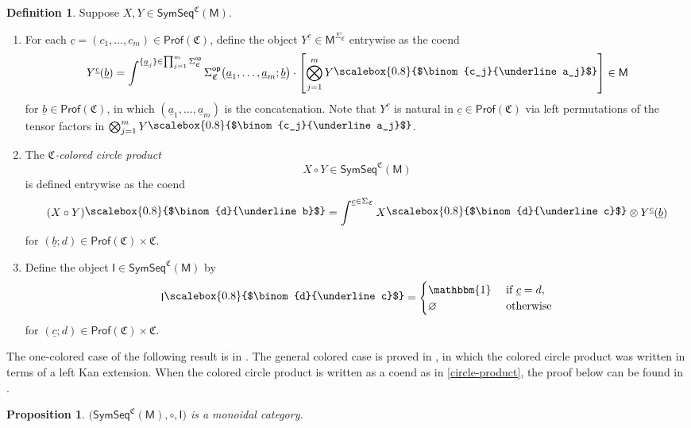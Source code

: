 \documentclass[11pt]{amsbook}
\numberwithin{section}{chapter}
\numberwithin{subsection}{section}
\numberwithin{equation}{section}
\theoremstyle{plain}
\newtheorem{proposition}[equation]{Proposition}
\theoremstyle{definition}
\newtheorem{definition}[equation]{Definition}
\newcommand{\colorc}{\mathfrak{C}}
\newcommand{\Prof}{\mathsf{Prof}}
\newcommand{\Profc}{\Prof(\colorc)}
\newcommand{\Profcc}{\Profc \times \colorc}
\newcommand{\op}{\mathsf{op}}
\newcommand{\I}{\mathsf{I}}
\newcommand{\M}{\mathsf{M}}
\newcommand{\tensorunit}{\mathbbm{1}}
\renewcommand{\emptyset}{\varnothing}
\newcommand{\Sigmaop}{\Sigma^{\op}}
\newcommand{\Sigmac}{\Sigma_{\colorc}}
\newcommand{\Sigmacop}{\Sigmaop_{\colorc}}
\newcommand{\symseq}{\mathsf{SymSeq}}
\newcommand{\symseqcm}{\symseq^{\colorc}(\M)}
\newcommand{\ua}{\underline a}
\newcommand{\ub}{\underline b}
\newcommand{\uc}{\underline c}
\newcommand{\smallprof}[1]
{\raisebox{.05cm}{\scalebox{0.8}{#1}}}
\newcommand{\cjuaj}{\smallprof{$\binom{c_j}{\ua_j}$}}
\newcommand{\dub}{\smallprof{$\binom{d}{\ub}$}}
\newcommand{\duc}{\smallprof{$\binom{d}{\uc}$}}
\begin{document}
\begin{definition}\label{def:colored-circle-product}
Suppose $X,Y  \in \symseqcm$.
\begin{enumerate}
\item For each $\uc = (c_1,\ldots,c_m) \in \Profc$, define the object $Y^{\uc} \in \M^{\Sigmac}$ entrywise as the coend
\begin{equation}\label{ytensorc}
Y^{\uc}(\ub) = \int^{\{\ua_j\}\in\prod_{j=1}^m \Sigmacop} \Sigmacop\bigl(\ua_1,\ldots,\ua_m;\ub\bigr) \cdot \left[\bigotimes_{j=1}^m Y\cjuaj\right] \in \M
\end{equation}
for $\ub \in \Profc$, in which $(\ua_1,\ldots,\ua_m)$ is the concatenation.	 Note that $Y^{\uc}$ is natural in $\uc \in \Profc$ via left permutations of the tensor factors in $\bigotimes_{j=1}^m Y\cjuaj$.
\item The \emph{$\colorc$-colored circle product} \[X \circ Y \in \symseqcm\] is defined entrywise as the coend
\begin{equation}\label{circle-product}
(X \circ Y)\dub = \int^{\uc \in \Sigmac} X\duc \otimes Y^{\uc}(\ub) 
\end{equation}
for $(\ub;d) \in \Profcc$.
\item Define the object $\I \in \symseqcm$ by
\begin{equation}\label{unit-operad}
\I\duc = \begin{cases} \tensorunit & \text{ if $\uc=d$},\\
\emptyset & \text{ otherwise}\end{cases}
\end{equation}
for $(\uc;d) \in \Profcc$.
\end{enumerate}
\end{definition}

The one-colored case of the following result is in \cite{kelly}.  The general colored case is proved in \cite{white-yau}, in which the colored circle product was written in terms of a left Kan extension.  When the colored circle product is written as a coend as in \eqref{circle-product}, the proof below can be found in \cite{bsw}.

\begin{proposition}\label{circle-product-monoidal}
$\bigl(\symseqcm, \circ, \I\bigr)$ is a monoidal category.
\end{proposition}
\end{document}
